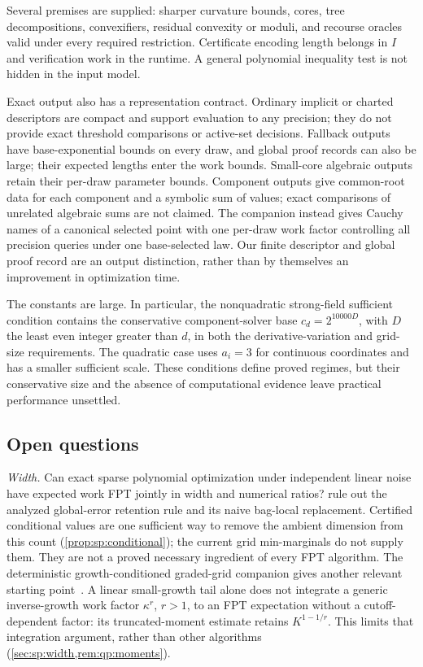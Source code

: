 Several premises are supplied: sharper curvature bounds, cores, tree
decompositions, convexifiers, residual convexity or moduli, and recourse
oracles valid under every required restriction. Certificate encoding length
belongs in $I$ and verification work in the runtime. A general polynomial
inequality test is not hidden in the input model.

Exact output also has a representation contract. Ordinary implicit or
charted descriptors are compact and support evaluation to any precision;
they do not provide exact threshold comparisons or active-set decisions.
Fallback outputs have base-exponential bounds on every draw, and global
proof records can also be large; their expected lengths enter the work
bounds. Small-core algebraic outputs retain their per-draw parameter bounds.
Component outputs give common-root data for each component and a symbolic
sum of values; exact comparisons of unrelated algebraic sums are not
claimed. The companion instead gives Cauchy names of a canonical selected
point with one per-draw work factor controlling all precision queries under
one base-selected law. Our finite descriptor and global proof record are
an output distinction, rather than by themselves an improvement in
optimization time.

The constants are large. In particular, the nonquadratic strong-field
sufficient condition contains the conservative component-solver base
$c_d=2^{10000D}$, with $D$ the least even integer greater than $d$, in both
the derivative-variation and grid-size requirements. The quadratic case
uses $a_i=3$ for continuous coordinates and has a smaller sufficient scale.
These conditions define proved regimes, but their conservative size and the
absence of computational evidence leave practical performance unsettled.

\subsection{Open questions}\label{sec:disc:open}

\emph{Width.} Can exact sparse polynomial optimization under independent
linear noise have expected work FPT jointly in width and numerical ratios?
 rule out the analyzed global-error
retention rule and its naive bag-local replacement. Certified conditional
values are one sufficient way to remove the ambient dimension from this
count (\cref{prop:sp:conditional}); the current grid min-marginals do not
supply them. They are not a proved necessary ingredient of every FPT
algorithm. The deterministic growth-conditioned graded-grid companion gives
another relevant starting point~\citep{companion-decomposition-aware}.
A linear small-growth tail alone does not integrate a generic
inverse-growth work factor $\kappa^r$, $r>1$, to an FPT expectation without
a cutoff-dependent factor: its truncated-moment estimate retains
$K^{1-1/r}$. This limits that integration argument, rather than other
algorithms (\cref{sec:sp:width,rem:qp:moments}).


